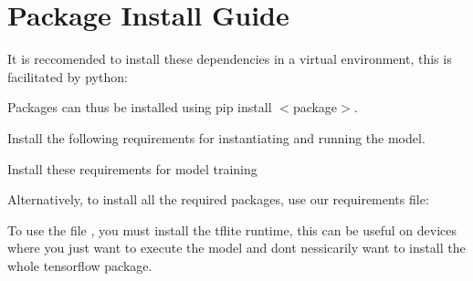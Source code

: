 \chapter{Package Install Guide}
\hypertarget{md_guides_2packages}{}\label{md_guides_2packages}
\label{md_guides_2packages_autotoc_md13}%
%


It is reccomended to install these dependencies in a virtual environment, this is facilitated by {\ttfamily python}\+:


\begin{DoxyCode}{0}

\end{DoxyCode}


Packages can thus be installed using {\ttfamily pip install \texorpdfstring{$<$}{<}package\texorpdfstring{$>$}{>}}.

Install the following requirements for instantiating and running the model.


\begin{DoxyCode}{0}

\end{DoxyCode}


Install these requirements for model training


\begin{DoxyCode}{0}

\end{DoxyCode}


Alternatively, to install all the required packages, use our requirements file\+:


\begin{DoxyCode}{0}

\end{DoxyCode}


To use the file {\ttfamily {}}, you must install the tflite runtime, this can be useful on devices where you just want to execute the model and don\textquotesingle{}t nessicarily want to install the whole tensorflow package.


\begin{DoxyCode}{0}

\end{DoxyCode}
 